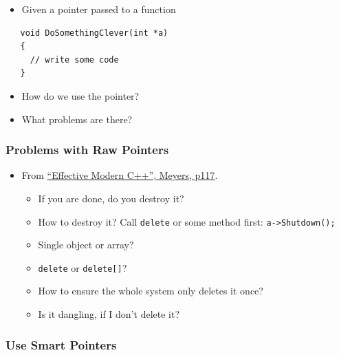 \begin{itemize}
\itemsep1pt\parskip0pt
\item
  Given a pointer passed to a function
\end{itemize}

\begin{verbatim}
   void DoSomethingClever(int *a) 
   {
     // write some code
   }
\end{verbatim}

\begin{itemize}
\itemsep1pt\parskip0pt
\item
  How do we use the pointer?
\item
  What problems are there?
\end{itemize}

\subsubsection{Problems with Raw
Pointers}\label{problems-with-raw-pointers}

\begin{itemize}
\itemsep1pt\parskip0pt
\item
  From
  \href{https://www.amazon.co.uk/Effective-Modern-Specific-Ways-Improve/dp/1491903996/ref=sr_1_1?ie=UTF8\&qid=1484571499\&sr=8-1\&keywords=Effective+Modern+C\%2B\%2B}{``Effective
  Modern C++'', Meyers, p117}.

  \begin{itemize}
  \itemsep1pt\parskip0pt
  \item
    If you are done, do you destroy it?
  \item
    How to destroy it? Call \texttt{delete} or some method first:
    \texttt{a-\textgreater{}Shutdown();}
  \item
    Single object or array?
  \item
    \texttt{delete} or \texttt{delete{[}{]}}?
  \item
    How to ensure the whole system only deletes it once?
  \item
    Is it dangling, if I don't delete it?
  \end{itemize}
\end{itemize}

\subsubsection{Use Smart Pointers}\label{use-smart-pointers}

